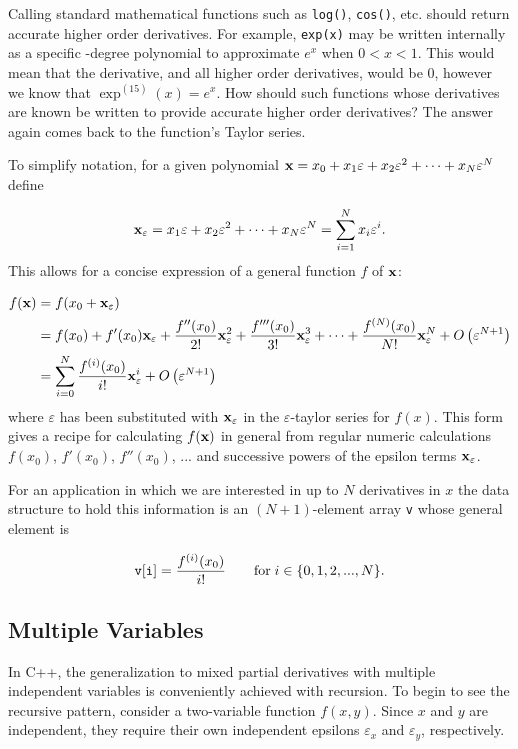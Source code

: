 \documentclass{article}
\begin{document}
Calling standard mathematical functions such as {\tt log()}, {\tt cos()}, etc. should return accurate higher
order derivatives. For example, {\tt exp(x)} may be written internally as a specific -degree polynomial to
approximate $e^x$ when $0<x<1$. This would mean that the  derivative, and all higher order derivatives,
would be 0, however we know that $\exp^{(15)}(x)=e^x$.  How should such functions whose derivatives are known be
written to provide accurate higher order derivatives? The answer again comes back to the function's Taylor series.

To simplify notation, for a given polynomial ${\bf x} = x_0 + x_1\varepsilon + x_2\varepsilon^2 +\cdots+
x_N\varepsilon^N$ define

\[
{\bf x}_\varepsilon = x_1\varepsilon + x_2\varepsilon^2 +\cdots+ x_N\varepsilon^N = \sum_{i=1}^Nx_i\varepsilon^i.
\]
This allows for a concise expression of a general function $f$ of $\bf x$:

\begin{align*}
f({\bf x}) &= f(x_0 + {\bf x}_\varepsilon) \\
 & = f(x_0) + f'(x_0){\bf x}_\varepsilon + \frac{f''(x_0)}{2!}{\bf x}_\varepsilon^2 + \frac{f'''(x_0)}{3!}{\bf x}_\varepsilon^3 + \cdots + \frac{f^{(N)}(x_0)}{N!}{\bf x}_\varepsilon^N + O\left(\varepsilon^{N+1}\right) \\
 & = \sum_{i=0}^N\frac{f^{(i)}(x_0)}{i!}{\bf x}_\varepsilon^i + O\left(\varepsilon^{N+1}\right)
\end{align*}
where $\varepsilon$ has been substituted with ${\bf x}_\varepsilon$ in the $\varepsilon$-taylor series
for $f(x)$. This form gives a recipe for calculating $f({\bf x})$ in general from regular numeric calculations
$f(x_0)$, $f'(x_0)$, $f''(x_0)$, ... and successive powers of the epsilon terms ${\bf x}_\varepsilon$.

For an application in which we are interested in up to $N$ derivatives in $x$ the data structure to hold
this information is an $(N+1)$-element array {\tt v} whose general element is

\[ {\tt v[i]} = \frac{f^{(i)}(x_0)}{i!} \qquad \text{for}\; i\in\{0,1,2,...,N\}. \]

\subsection{Multiple Variables}

In C++, the generalization to mixed partial derivatives with multiple independent variables is conveniently achieved
with recursion. To begin to see the recursive pattern, consider a two-variable function $f(x,y)$. Since $x$
and $y$ are independent, they require their own independent epsilons $\varepsilon_x$ and $\varepsilon_y$,
respectively.
\end{document}
